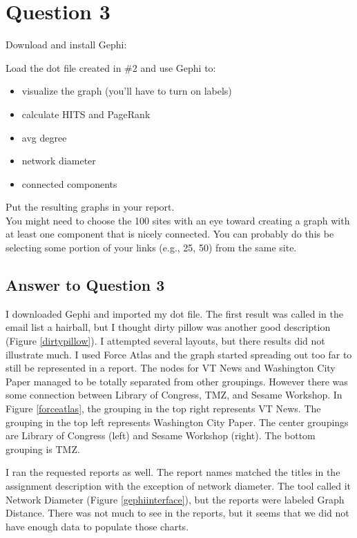 \documentclass{article}
\begin{document}
\clearpage

\section*{Question 3}
Download and install Gephi: \\
\url{}

Load the dot file created in \#2 and use Gephi to:
\begin{itemize}
\item visualize the graph (you'll have to turn on labels)
\item calculate HITS and PageRank
\item avg degree
\item network diameter
\item connected components
\end{itemize}

Put the resulting graphs in your report. \\

You might need to choose the 100 sites with an eye toward creating a graph with at least one component that is nicely connected. You can probably do this be selecting some portion of your links (e.g., 25, 50) from the same site.

\subsection*{Answer to Question 3}

I downloaded Gephi and imported my dot file. The first result was called in the email list a hairball, but I thought dirty pillow was another good description (Figure \ref{dirtypillow}). I attempted several layouts, but there results did not illustrate much. I used Force Atlas and the graph started spreading out too far to still be represented in a report. The nodes for VT News and Washington City Paper managed to be totally separated from other groupings. However there was some connection between Library of Congress, TMZ, and Sesame Workshop. In Figure \ref{forceatlas}, the grouping in the top right represents VT News. The grouping in the top left represents Washington City Paper. The center groupings are Library of Congress (left) and Sesame Workshop (right). The bottom grouping is TMZ.

I ran the requested reports as well. The report names matched the titles in the assignment description with the exception of network diameter. The tool called it Network Diameter (Figure \ref{gephiinterface}), but the reports were labeled Graph Distance. There was not much to see in the reports, but it seems that we did not have enough data to populate those charts.
\end{document}
